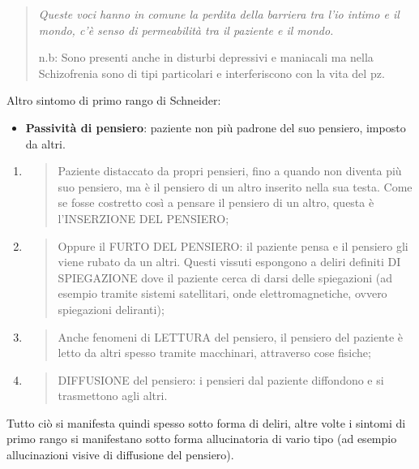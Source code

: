 \documentclass[]{article}
\begin{document}
\begin{quote}
\emph{Queste voci hanno in comune la perdita della barriera tra l'io
intimo e il mondo, c'è senso di permeabilità tra il paziente e il
mondo.}

n.b: Sono presenti anche in disturbi depressivi e maniacali ma nella
Schizofrenia sono di tipi particolari e interferiscono con la vita del
pz.
\end{quote}

Altro sintomo di primo rango di Schneider:

\begin{itemize}
\item
  \textbf{Passività di pensiero}: paziente non più padrone del suo
  pensiero, imposto da altri.
\end{itemize}

\begin{enumerate}
\def\labelenumi{\arabic{enumi}.}
\item
  \begin{quote}
  Paziente distaccato da propri pensieri, fino a quando non diventa più
  suo pensiero, ma è il pensiero di un altro inserito nella sua testa.
  Come se fosse costretto così a pensare il pensiero di un altro, questa
  è l'INSERZIONE DEL PENSIERO;
  \end{quote}
\item
  \begin{quote}
  Oppure il FURTO DEL PENSIERO: il paziente pensa e il pensiero gli
  viene rubato da un altri. Questi vissuti espongono a deliri definiti
  DI SPIEGAZIONE dove il paziente cerca di darsi delle spiegazioni (ad
  esempio tramite sistemi satellitari, onde elettromagnetiche, ovvero
  spiegazioni deliranti);
  \end{quote}
\item
  \begin{quote}
  Anche fenomeni di LETTURA del pensiero, il pensiero del paziente è
  letto da altri spesso tramite macchinari, attraverso cose fisiche;
  \end{quote}
\item
  \begin{quote}
  DIFFUSIONE del pensiero: i pensieri dal paziente diffondono e si
  trasmettono agli altri.
  \end{quote}
\end{enumerate}

Tutto ciò si manifesta quindi spesso sotto forma di deliri, altre volte
i sintomi di primo rango si manifestano sotto forma allucinatoria di
vario tipo (ad esempio allucinazioni visive di diffusione del pensiero).
\end{document}
